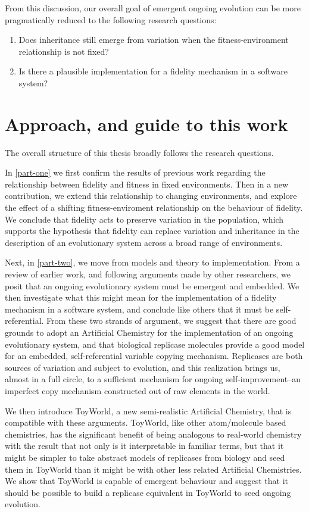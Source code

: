\documentclass[]{report}
\begin{document}
From this discussion, our overall goal of emergent ongoing evolution can be more pragmatically reduced to the following research questions:

\begin{enumerate}
	\item Does inheritance still emerge from variation when the fitness-environment relationship is not fixed?
	\item Is there a plausible implementation for a fidelity mechanism in a software system?
\end{enumerate}

\section{Approach, and guide to this work}

The overall structure of this thesis broadly follows the research questions. 

In \ref{part-one} we first confirm the results of previous work regarding the relationship between fidelity and fitness in fixed environments. Then in a new contribution, we extend this relationship to changing environments, and explore the effect of a shifting fitness-enviroment relationship on the behaviour of fidelity. We conclude that fidelity acts to preserve variation in the population, which supports the hypothesis that fidelity can replace variation and inheritance in the description of an evolutionary system across a broad range of environments.

Next, in \ref{part-two}, we move from models and theory to implementation. From a review of earlier work, and following arguments made by other researchers, we posit that an ongoing evolutionary system must be emergent and embedded. We then investigate what this might mean for the implementation of a fidelity mechanism in a software system, and conclude like others that it must be self-referential. From these two strands of argument, we suggest that there are good grounds to adopt an Artificial Chemistry for the implementation of an ongoing evolutionary system, and that biological replicase molecules provide a good model for an embedded, self-referential variable copying mechanism. Replicases are both sources of variation and subject to evolution, and this realization brings us, almost in a full circle, to a sufficient mechanism for ongoing self-improvement--an imperfect copy mechanism constructed out of raw elements in the world.

We then introduce ToyWorld, a new semi-realistic Artificial Chemistry, that is compatible with these arguments. ToyWorld, like other atom/molecule based chemistries, has the significant benefit of being analogous to real-world chemistry with the result that not only is it interpretable in familiar terms, but that it might be simpler to take abstract models of replicases from biology and seed them in ToyWorld than it might be with other less related Artificial Chemistries. We show that ToyWorld is capable of emergent behaviour and suggest that it should be possible to build a replicase equivalent in ToyWorld to seed ongoing evolution.
\end{document}
